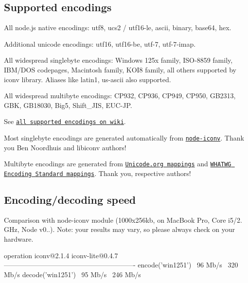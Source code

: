 \subsection*{Supported encodings}


\begin{DoxyItemize}
\item All node.\+js native encodings\+: utf8, ucs2 / utf16-\/le, ascii, binary, base64, hex.
\item Additional unicode encodings\+: utf16, utf16-\/be, utf-\/7, utf-\/7-\/imap.
\item All widespread singlebyte encodings\+: Windows 125x family, I\+S\+O-\/8859 family, I\+B\+M/\+D\+OS codepages, Macintosh family, K\+O\+I8 family, all others supported by iconv library. Aliases like \textquotesingle{}latin1\textquotesingle{}, \textquotesingle{}us-\/ascii\textquotesingle{} also supported.
\item All widespread multibyte encodings\+: C\+P932, C\+P936, C\+P949, C\+P950, G\+B2313, G\+BK, G\+B18030, Big5, Shift\+\_\+\+J\+IS, E\+U\+C-\/\+JP.
\end{DoxyItemize}

See \href{https://github.com/ashtuchkin/iconv-lite/wiki/Supported-Encodings}{\tt all supported encodings on wiki}.

Most singlebyte encodings are generated automatically from \href{https://github.com/bnoordhuis/node-iconv}{\tt node-\/iconv}. Thank you Ben Noordhuis and libiconv authors!

Multibyte encodings are generated from \href{http://www.unicode.org/Public/MAPPINGS/}{\tt Unicode.\+org mappings} and \href{http://encoding.spec.whatwg.org/}{\tt W\+H\+A\+T\+WG Encoding Standard mappings}. Thank you, respective authors!

\subsection*{Encoding/decoding speed}

Comparison with node-\/iconv module (1000x256kb, on Mac\+Book Pro, Core i5/2. G\+Hz, Node v0..). Note\+: your results may vary, so please always check on your hardware. \begin{DoxyVerb}operation             iconv@2.1.4   iconv-lite@0.4.7
----------------------------------------------------------
encode('win1251')     ~96 Mb/s      ~320 Mb/s
decode('win1251')     ~95 Mb/s      ~246 Mb/s
\end{DoxyVerb}


